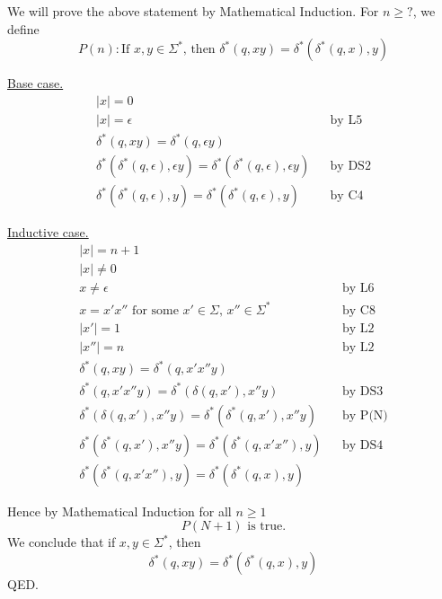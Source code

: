 We will prove the above statement by Mathematical Induction.
For $n \geq ?$, we define
\[
P(n):
\text{
If $x,y \in \Sigma^*$, then $\delta^* (q, xy) = \delta^*(\delta^*(q,x),y)$
}
\]

\underline{Base case.}
\begin{align*}
|x| = 0                                                                             & & \\
|x| = \epsilon                                                                      & & \text{by L5} \\
\delta^*(q,xy)=\delta^*(q,\epsilon y)                                               & & \\
\delta^*(\delta^*(q,\epsilon),\epsilon y)=\delta^*(\delta^*(q,\epsilon),\epsilon y) & & \text{by DS2} \\
\delta^*(\delta^*(q,\epsilon),y)=\delta^*(\delta^*(q,\epsilon),y)                   & & \text{by C4}
\end{align*}

\underline{Inductive case.}
\begin{align*}
|x| = n + 1                                                     & & \\
|x| \ne 0                                                       & & \\
x \ne \epsilon                                                  & & \text{by L6} \\
x = x'x''\text{ for some } x' \in \Sigma\text{, }x''\in\Sigma^* & & \text{by C8} \\
|x'| = 1                                                        & & \text{by L2} \\
|x''| = n                                                       & & \text{by L2} \\
\delta^*(q,xy)=\delta^*(q,x'x''y)                               & & \\
\delta^*(q,x'x''y)=\delta^*(\delta(q,x'),x''y)                  & & \text{by DS3} \\
\delta^*(\delta(q,x'),x''y)=\delta^*(\delta^*(q,x'),x''y)       & & \text{by P(N)} \\
\delta^*(\delta^*(q,x'),x''y)=\delta^*(\delta^*(q,x'x''),y)     & & \text{by DS4} \\
\delta^*(\delta^*(q,x'x''),y)=\delta^*(\delta^*(q,x),y)
\end{align*}

Hence by Mathematical Induction for all $n \geq 1$
\[
P(N+1)\text{ is true.}
\]
We conclude that if $x,y \in \Sigma^*$, then
\[
\delta^*(q, xy) = \delta^*(\delta^*(q, x), y)
\]
QED.
